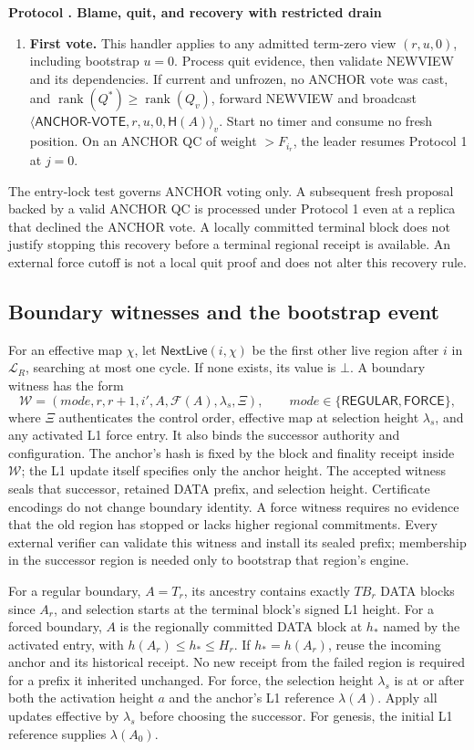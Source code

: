 \documentclass[11pt,a4paper]{article}
\newcommand{\RR}[1]{{\color{rrRed}#1}}
\newcommand{\FC}{\mathcal F}
\newcommand{\Hash}{\mathsf H}
\newcommand{\rank}{\operatorname{rank}}
\newcommand{\tagg}[1]{\ensuremath{\mathsf{#1}}}
\newcounter{protocol}
\newenvironment{protocol}[2]{\refstepcounter{protocol}\label{#1}
\begin{mdframed}[nobreak=true,linewidth=.6pt,skipabove=8pt,skipbelow=8pt,
innertopmargin=7pt,innerbottommargin=7pt]\small
\textbf{Protocol \theprotocol. #2}\par\smallskip}{\end{mdframed}}
\begin{document}
\begin{protocol}{alg:recovery}{Blame, quit, and recovery with restricted drain}
\begin{enumerate}[label=\textbf{\arabic*)},itemsep=5pt]
\item \textbf{First vote.} \RR{This handler applies to any admitted
term-zero view $(r,u,0)$, including bootstrap $u=0$.} Process quit evidence,
then validate NEWVIEW and its dependencies. If current and unfrozen,
no ANCHOR vote was cast, and $\rank(Q^*)\ge\rank(Q_v)$, forward NEWVIEW
and broadcast
$\langle\tagg{ANCHOR\mbox{-}VOTE},r,u,0,\Hash(A)\rangle_v$.
Start no timer and consume no fresh position. On an ANCHOR QC
\RR{of weight $>F_{i_r}$}, the leader resumes Protocol 1 at $j=0$.
\end{enumerate}
\end{protocol}

The entry-lock test governs ANCHOR voting only. A subsequent fresh
proposal backed by a valid ANCHOR QC is processed under Protocol 1 even
at a replica that declined the ANCHOR vote. A locally committed terminal
block does not justify stopping this recovery before a terminal regional
receipt is available. An external force cutoff is not a local quit proof
and does not alter this recovery rule.

\subsection{Boundary witnesses and the bootstrap event}
\label{sec:boundary}
For an effective map $\chi$, let $\tagg{NextLive}(i,\chi)$ be the first
other live region after $i$ in $\mathcal L_R$, searching at most one cycle.
If none exists, its value is $\bot$. A boundary witness has the form
\[
 \mathcal W=(\mathit{mode},r,r+1,i',A,\FC(A),\lambda_s,\Xi),
 \qquad \mathit{mode}\in\{\tagg{REGULAR},\tagg{FORCE}\},
\]
where $\Xi$ authenticates the control order, effective map at selection
height $\lambda_s$, and any activated L1 force entry. It also
binds the successor authority and configuration. The anchor's hash is
fixed by the block and finality receipt inside $\mathcal W$; the
L1 update itself specifies only the anchor height. The accepted witness seals that successor,
retained DATA prefix, and selection height. Certificate encodings do not
change boundary identity. A force witness requires no evidence that the
old region has stopped or lacks higher regional commitments.
Every external verifier can validate this witness and install its sealed
prefix; membership in the successor region is needed only to bootstrap
that region's engine.

For a regular boundary, $A=T_r$, its ancestry contains exactly $TB_r$
DATA blocks since $A_r$, and selection starts at the terminal block's
signed L1 height. For a forced boundary, $A$ is the regionally committed DATA block
at $h_*$ named by the activated entry, with
$h(A_r)\le h_*\le H_r$. If $h_*=h(A_r)$, reuse the incoming anchor and
its historical receipt. No new receipt from the failed region is required
for a prefix it inherited unchanged.
For force, the selection height $\lambda_s$ is at or after both the
activation height $a$ and the anchor's L1 reference $\lambda(A)$.
Apply all updates effective by $\lambda_s$ before choosing the successor.
For genesis, the initial L1 reference supplies $\lambda(A_0)$.
\end{document}

